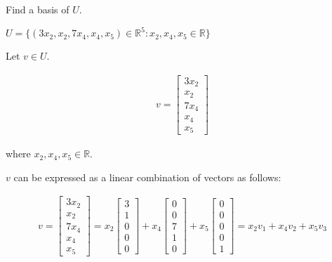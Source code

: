 \documentclass[fleqn]{article}
\begin{document}
\begin{enumerate}[nolistsep]
\begin{enumerate}[nolistsep]
				Find a basis of $U$.
				
				$U = \{(3x_2, x_2, 7x_4, x_4, x_5) \in \mathbb{R}^5 : x_2, x_4, x_5 \in \mathbb{R}\}$
				
				Let $v \in U$.
				
				\begin{singlespacing}
					\setlength{\abovedisplayskip}{0pt}
					\setlength{\belowdisplayskip}{10pt}
					\setlength{\abovedisplayshortskip}{0pt}
					\setlength{\belowdisplayshortskip}{10pt}
					\setlength{\mathindent}{0pt}
					\begin{align*}
					 v = \begin{bmatrix}3x_2 \\ x_2 \\ 7x_4 \\ x_4 \\ x_5 \end{bmatrix}
					\end{align*}
				\end{singlespacing}
				
				where $x_2, x_4, x_5 \in \mathbb{R}$.
				
				$v$ can be expressed as a linear combination of vectors as follows:
				
				\begin{singlespacing}
					\setlength{\abovedisplayskip}{0pt}
					\setlength{\belowdisplayskip}{10pt}
					\setlength{\abovedisplayshortskip}{0pt}
					\setlength{\belowdisplayshortskip}{10pt}
					\setlength{\mathindent}{0pt}
					\begin{align*}
					v = \begin{bmatrix}3x_2 \\ x_2 \\ 7x_4 \\ x_4 \\ x_5 \end{bmatrix} = x_2 \begin{bmatrix}3 \\ 1 \\ 0 \\ 0 \\ 0 \end{bmatrix} + x_4 \begin{bmatrix}0 \\ 0 \\ 7 \\ 1 \\ 0 \end{bmatrix} + x_5 \begin{bmatrix}0 \\ 0 \\ 0 \\ 0 \\ 1 \end{bmatrix} = x_2v_1 + x_4v_2 + x_5v_3
					\end{align*}
				\end{singlespacing}
				

\end{enumerate}
\end{enumerate}
\end{document}
